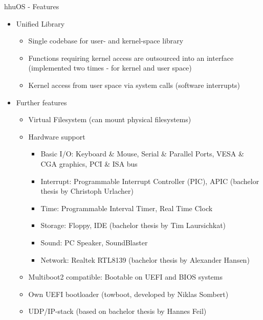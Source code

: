 	\begin{frame}{hhuOS - Features}
		\begin{itemize}
			\item Unified Library
			\begin{itemize}
				\item Single codebase for user- and kernel-space library
				\item Functions requiring kernel access are outsourced into an interface (implemented two times - for kernel and user space)
				\item Kernel access from user space via system calls (software interrupts)
			\end{itemize}
			\pause
			\item Further features
			\begin{itemize}
				\item Virtual Filesystem (can mount physical filesystems)
				\item Hardware support
					\begin{itemize}
						\item Basic I/O: Keyboard \& Mouse, Serial \& Parallel Ports, VESA \& CGA graphics, PCI \& ISA bus
						\item Interrupt: Programmable Interrupt Controller (PIC), APIC (bachelor thesis by Christoph Urlacher)
						\item Time: Programmable Interval Timer, Real Time Clock
						\item Storage: Floppy, IDE (bachelor thesis by Tim Laursichkat)
						\item Sound: PC Speaker, SoundBlaster
						\item Network: Realtek RTL8139 (bachelor thesis by Alexander Hansen)
					\end{itemize}
				\item Multiboot2 compatible: Bootable on UEFI and BIOS systems
				\item Own UEFI bootloader (towboot, developed by Niklas Sombert)
				\item UDP/IP-stack (based on bachelor thesis by Hannes Feil)
			\end{itemize}	
		\end{itemize}
	\end{frame}
